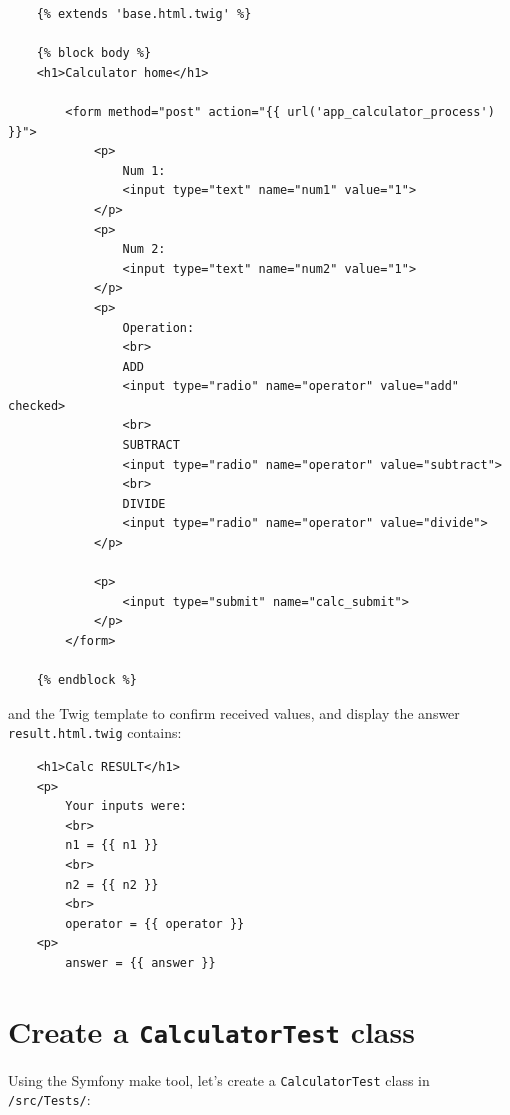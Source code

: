 \documentclass[a4paperpaper,openright]{book}
\begin{document}
\begin{verbatim}
    {% extends 'base.html.twig' %}

    {% block body %}
    <h1>Calculator home</h1>

        <form method="post" action="{{ url('app_calculator_process') }}">
            <p>
                Num 1:
                <input type="text" name="num1" value="1">
            </p>
            <p>
                Num 2:
                <input type="text" name="num2" value="1">
            </p>
            <p>
                Operation:
                <br>
                ADD
                <input type="radio" name="operator" value="add" checked>
                <br>
                SUBTRACT
                <input type="radio" name="operator" value="subtract">
                <br>
                DIVIDE
                <input type="radio" name="operator" value="divide">
            </p>

            <p>
                <input type="submit" name="calc_submit">
            </p>
        </form>

    {% endblock %}
\end{verbatim}

and the Twig template to confirm received values, and display the answer
\texttt{result.html.twig} contains:

\begin{verbatim}
    <h1>Calc RESULT</h1>
    <p>
        Your inputs were:
        <br>
        n1 = {{ n1 }}
        <br>
        n2 = {{ n2 }}
        <br>
        operator = {{ operator }}
    <p>
        answer = {{ answer }}
\end{verbatim}

\hypertarget{create-a-calculatortest-class}{%
\section{\texorpdfstring{Create a \texttt{CalculatorTest}
class}{Create a CalculatorTest class}}\label{create-a-calculatortest-class}}

Using the Symfony make tool, let's create a \texttt{CalculatorTest}
class in \texttt{/src/Tests/}:
\end{document}
